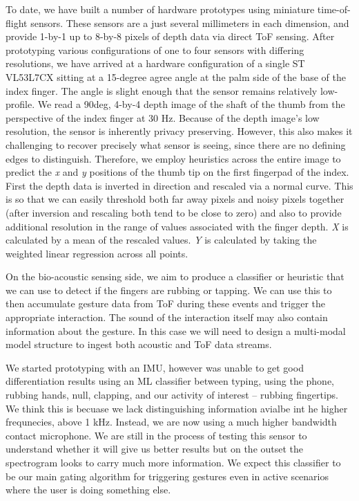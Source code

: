\documentclass [11pt, proquest] {uwthesis}[2020/02/24]
\begin{document}
To date, we have built a number of hardware prototypes using  miniature time-of-flight sensors. These sensors are a just several millimeters in each dimension, and provide 1-by-1 up to 8-by-8 pixels of depth data via direct ToF sensing.
After prototyping various configurations of one to four sensors with differing resolutions, we have arrived at a hardware configuration of a single ST VL53L7CX sitting at a 15-degree agree angle at the palm side of the base of the index finger. The angle is slight enough that the sensor remains relatively low-profile. We read a 90deg, 4-by-4 depth image of the shaft of the thumb from the perspective of the index finger at 30 Hz. Because of the depth image's low resolution, the sensor is inherently privacy preserving. However, this also makes it challenging to recover precisely what sensor is seeing, since there are no defining edges to distinguish. Therefore, we employ heuristics across the entire image to predict the \textit{x} and \textit{y} positions of the thumb tip on the first fingerpad of the index. First the depth data is inverted in direction and rescaled via a normal curve. This is so that we can easily threshold both far away pixels and noisy pixels together (after inversion and rescaling both tend to be close to zero) and also to provide additional resolution in the range of values associated with the finger depth. \textit{X} is calculated by a mean of the rescaled values. \textit{Y} is calculated by taking the weighted linear regression across all points. 

On the bio-acoustic sensing side, we aim to produce a classifier or heuristic that we can use to detect if the fingers are rubbing or tapping. We can use this to then accumulate gesture data from ToF during these events and trigger the appropriate interaction. The sound of the interaction itself may also contain information about the gesture. In this case we will need to design a multi-modal model structure to ingest both acoustic and ToF data streams.

We started prototyping with an IMU, however was unable to get good differentiation results using an ML classifier between typing, using the phone, rubbing hands, null, clapping, and our activity of interest -- rubbing fingertips. We think this is becuase we lack distinguishing information avialbe int he higher frequnecies, above 1 kHz. Instead, we are now using a much higher bandwidth contact microphone. We are still in the process of testing this sensor to understand whether it will give us better results but on the outset the spectrogram looks to carry much more information. We expect this classifier to be our main gating algorithm for triggering gestures even in active scenarios where the user is doing something else.
\end{document}
